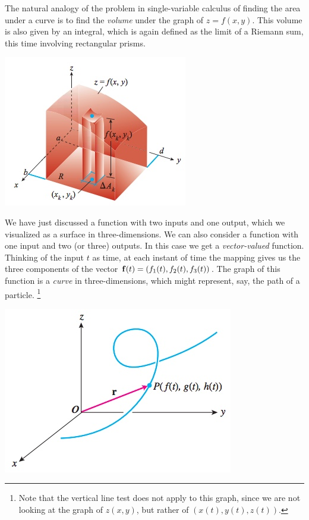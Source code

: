 \documentclass[12pt,letterpaper,reqno]{article}
\numberwithin{equation}{section}
\newcommand{\ti}[1]{\textit{#1}}
\begin{document}
The natural analogy of the problem in single-variable calculus of finding the area under a curve is to find the \ti{volume} under the graph of $z=f(x,y)$. This volume is also given by an integral, which is again defined as the limit of a Riemann sum, this time involving rectangular prisms.
\begin{center}
	\includegraphics[scale=0.5]{figures_mvc/double_integral_example}
\end{center} 

We have just discussed a function with two inputs and one output, which we visualized as a surface in three-dimensions. We can also consider a function with one input and two (or three) outputs. In this case we get a \ti{vector-valued} function. Thinking of the input $t$ as time, at each instant of time the mapping gives us the three components of the vector ${\bf f}(t)=(f_1(t),f_2(t),f_3(t))$. The graph of this function is a \ti{curve} in three-dimensions, which might represent, say, the path of a particle. \footnote{Note that the vertical line test does not apply to this graph, since we are not looking at the graph of $z(x,y)$, but rather of $(x(t),y(t),z(t))$.}
\begin{center}
	\includegraphics[scale=0.5]{figures_mvc/path_of_a_particle}
\end{center}
\end{document}
